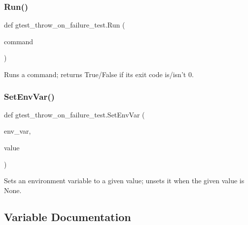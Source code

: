 \subsubsection{\texorpdfstring{Run()}{Run()}}
{\footnotesize\ttfamily def gtest\+\_\+throw\+\_\+on\+\_\+failure\+\_\+test.\+Run (\begin{DoxyParamCaption}\item[{}]{command }\end{DoxyParamCaption})}

\begin{DoxyVerb}Runs a command; returns True/False if its exit code is/isn't 0.\end{DoxyVerb}
 \mbox{\label{namespacegtest__throw__on__failure__test_a79d85cfffbf8e8381ba32483ddc305c0}} 
\subsubsection{\texorpdfstring{Set\+Env\+Var()}{SetEnvVar()}}
{\footnotesize\ttfamily def gtest\+\_\+throw\+\_\+on\+\_\+failure\+\_\+test.\+Set\+Env\+Var (\begin{DoxyParamCaption}\item[{}]{env\+\_\+var,  }\item[{}]{value }\end{DoxyParamCaption})}

\begin{DoxyVerb}Sets an environment variable to a given value; unsets it when the
given value is None.
\end{DoxyVerb}
 

\subsection{Variable Documentation}
\mbox{\label{namespacegtest__throw__on__failure__test_ac38dda23e362ecc76943073d173294f1}} 

